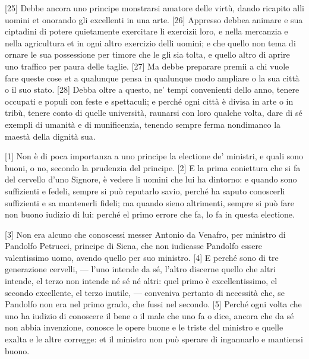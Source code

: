 {[}25{]} Debbe ancora uno principe monstrarsi amatore delle virtù, dando
ricapito alli uomini et onorando gli excellenti in una arte. {[}26{]}
Appresso debbea animare e sua ciptadini di potere quietamente exercitare
li exercizii loro, e nella mercanzia e nella agricultura et in ogni
altro exercizio delli uomini; e che quello non tema di ornare le sua
possessione per timore che le gli sia tolta, e quello altro di aprire
uno traffico per paura delle taglie. {[}27{]} Ma debbe preparare premii
a chi vuole fare queste cose et a qualunque pensa in qualunque modo
ampliare o la sua città o il suo stato. {[}28{]} Debba oltre a questo,
ne' tempi convenienti dello anno, tenere occupati e populi con feste e
spettaculi; e perché ogni città è divisa in arte o in tribù, tenere
conto di quelle università, raunarsi con loro qualche volta, dare di sé
exempli di umanità e di munificenzia, tenendo sempre ferma nondimanco la
maestà della dignità sua.


{[}1{]} Non è di poca importanza a uno principe la electione de'
ministri, e quali sono buoni, o no, secondo la prudenzia del principe.
{[}2{]} E la prima coniettura che si fa del cervello d'uno Signore, è
vedere li uomini che lui ha dintorno: e quando sono suffizienti e
fedeli, sempre si può reputarlo savio, perché ha saputo conoscerli
suffizienti e sa mantenerli fideli; ma quando sieno altrimenti, sempre
si può fare non buono iudizio di lui: perché el primo errore che fa, lo
fa in questa electione.

{[}3{]} Non era alcuno che conoscessi messer Antonio da Venafro, per
ministro di Pandolfo Petrucci, principe di Siena, che non iudicasse
Pandolfo essere valentissimo uomo, avendo quello per suo ministro.
{[}4{]} E perché sono di tre generazione cervelli, --- l'uno intende da
sé, l'altro discerne quello che altri intende, el terzo non intende né
sé né altri: quel primo è excellentissimo, el secondo excellente, el
terzo inutile, --- conveniva pertanto di necessità che, se Pandolfo non
era nel primo grado, che fussi nel secondo.
{[}5{]} Perché ogni volta che uno ha iudizio di conoscere il bene o il
male che uno fa o dice, ancora che da sé non abbia invenzione, conosce
le opere buone e le triste del ministro e quelle exalta e le altre
corregge: et il ministro non può sperare di ingannarlo e mantiensi
buono.

